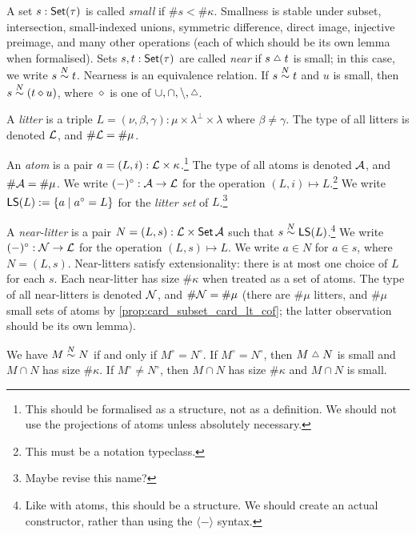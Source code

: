 \begin{definition}[small]
  \label{def:Small}
  A set \( s : \operatorname{\mathsf{Set}}(\tau) \) is called \emph{small} if \( \#s < \#\kappa \).
  Smallness is stable under subset, intersection, small-indexed unions, symmetric difference, direct image, injective preimage, and many other operations (each of which should be its own lemma when formalised).
  Sets \( s, t : \operatorname{\mathsf{Set}}(\tau) \) are called \emph{near} if \( s \symmdiff t \) is small; in this case, we write \( s \mathrel{\overset{N}{\sim}} t \).
  Nearness is an equivalence relation.
  If \( s \mathrel{\overset{N}{\sim}} t \) and \( u \) is small, then \( s \mathrel{\overset{N}{\sim}} (t \mathbin{\diamond} u) \), where \( \diamond \) is one of \( \cup, \cap, \setminus, \symmdiff \).
\end{definition}
\begin{definition}[litter]
  \label{def:Litter}
  A \emph{litter} is a triple \( L = (\nu, \beta, \gamma) : \mu \times \lambda^\bot \times \lambda \) where \( \beta \neq \gamma \).
  The type of all litters is denoted \( {\mathcal L} \), and \( \#{\mathcal L} = \#\mu \).
\end{definition}
\begin{definition}[atom]
  \label{def:Atom}
  An \emph{atom} is a pair \( a = (L, i) : {\mathcal L} \times \kappa \).\footnote{This should be formalised as a structure, not as a definition. We should not use the projections of atoms unless absolutely necessary.}
  The type of all atoms is denoted \( {\mathcal A} \), and \( \#{\mathcal A} = \#\mu \).
  We write \( (-)^\circ : {\mathcal A} \to {\mathcal L} \) for the operation \( (L, i) \mapsto L \).\footnote{This must be a notation typeclass.}
  We write \( \operatorname{\mathsf{LS}}(L) := \{ a \mid a^\circ = L \} \) for the \emph{litter set} of \( L \).\footnote{Maybe revise this name?}
\end{definition}
\begin{definition}
  \label{def:NearLitter}
  A \emph{near-litter} is a pair \( N = (L, s) : {\mathcal L} \times \operatorname{\mathsf{Set}} {\mathcal A} \) such that \( s \mathrel{\overset{N}{\sim}} \operatorname{\mathsf{LS}}(L) \).\footnote{Like with atoms, this should be a structure. We should create an actual constructor, rather than using the \( \langle - \rangle \) syntax.}
  We write \( (-)^\circ : {\mathcal N} \to {\mathcal L} \) for the operation \( (L, s) \mapsto L \).
  We write \( a \in N \) for \( a \in s \), where \( N = (L, s) \).
  Near-litters satisfy extensionality: there is at most one choice of \( L \) for each \( s \).
  Each near-litter has size \( \#\kappa \) when treated as a set of atoms.
  The type of all near-litters is denoted \( {\mathcal N} \), and \( \#{\mathcal N} = \#\mu \) (there are \( \#\mu \) litters, and \( \#\mu \) small sets of atoms by \cref{prop:card_subset_card_lt_cof}; the latter observation should be its own lemma).

  We have \( M \mathrel{\overset{N}{\sim}} N \) if and only if \( M^\circ = N^\circ \).
  If \( M^\circ = N^\circ \), then \( M \symmdiff N \) is small and \( M \cap N \) has size \( \#\kappa \).
  If \( M^\circ \neq N^\circ \), then \( M \cap N \) has size \( \#\kappa \) and \( M \cap N \) is small.
\end{definition}
